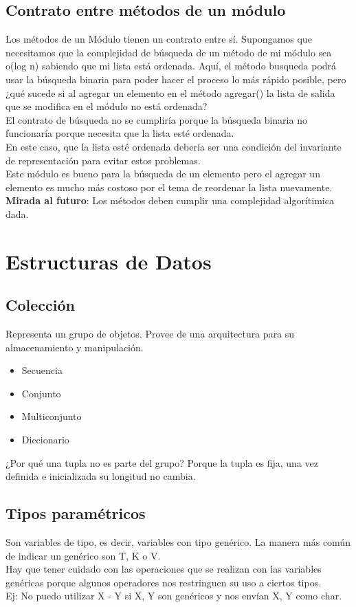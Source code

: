 \documentclass[10pt,a4paper]{article}
\begin{document}
\subsection*{Contrato entre métodos de un módulo}
Los métodos de un Módulo tienen un contrato entre sí.
Supongamos que necesitamos que la complejidad de búsqueda de un método de mi módulo sea o(log n) sabiendo que mi lista está ordenada. Aquí, el método busqueda podrá usar la búsqueda binaria para poder hacer el proceso lo más rápido posible, pero ¿qué sucede si al agregar un elemento en el método agregar() la lista de salida que se modifica en el módulo no está ordenada? \\ El contrato de búsqueda no se cumpliría porque la búsqueda binaria no funcionaría porque necesita que la lista esté ordenada. \\

En este caso, que la lista esté ordenada debería ser una condición del invariante de representación para evitar estos problemas. \\

Este módulo es bueno para la búsqueda de un elemento pero el agregar un elemento es mucho más costoso por el tema de reordenar la lista nuevamente. \\

\textbf{Mirada al futuro}: Los métodos deben cumplir una complejidad algorítimica dada.
\section*{Estructuras de Datos}
\subsection*{Colección}
Representa un grupo de objetos. Provee de una arquitectura para su almacenamiento y manipulación.
\begin{itemize}
    \item Secuencia
    \item Conjunto
    \item Multiconjunto
    \item Diccionario
\end{itemize}
¿Por qué una tupla no es parte del grupo? Porque la tupla es fija, una vez definida e inicializada su longitud no cambia.
\subsection*{Tipos paramétricos}
Son variables de tipo, es decir, variables con tipo genérico.
La manera más común de indicar un genérico son T, K o V.  \\
Hay que tener cuidado con las operaciones que se realizan con las variables genéricas porque algunos operadores nos restringuen su uso a ciertos tipos. \\
Ej: No puedo utilizar X - Y si X, Y son genéricos y nos envían X, Y como char.
\end{document}
